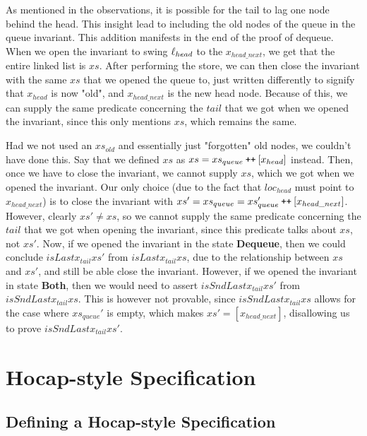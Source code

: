 \documentclass[a4paper, 11pt]{report}
\newcommand{\DequeueState}{\textbf{Dequeue}}
\newcommand{\BothState}{\textbf{Both}}
\newcommand\catenate{\mathbin{\text{\ttfamily\upshape ++}}}
\begin{document}
As mentioned in the observations, it is possible for the tail to lag one node behind the head. This insight lead to including the old nodes of the queue in the queue invariant. This addition manifests in the end of the proof of dequeue. When we open the invariant to swing $\ell_{head}$ to the $x_{head\_next}$, we get that the entire linked list is $xs$. After performing the store, we can then close the invariant with the same $xs$ that we opened the queue to, just written differently to signify that $x_{head}$ is now "old", and $x_{head\_next}$ is the new head node. Because of this, we can supply the same predicate concerning the $tail$ that we got when we opened the invariant, since this only mentions $xs$, which remains the same.

Had we not used an $xs_{old}$ and essentially just "forgotten" old nodes, we couldn't have done this. Say that we defined $xs$ as $xs = xs_{queue} \catenate [x_{head}]$ instead. Then, once we have to close the invariant, we cannot supply $xs$, which we got when we opened the invariant. Our only choice (due to the fact that $loc_{head}$ must point to $x_{head\_next}$) is to close the invariant with $xs' = xs_{queue} = xs_{queue}' \catenate [x_{head\_next}]$. However, clearly $xs' \neq xs$, so we cannot supply the same predicate concerning the $tail$ that we got when opening the invariant, since this predicate talks about $xs$, not $xs'$. Now, if we opened the invariant in the state \DequeueState{}, then we could conclude $isLast x_{tail} xs'$ from $isLast x_{tail} xs$, due to the relationship between $xs$ and $xs'$, and still be able close the invariant. However, if we opened the invariant in state \BothState{}, then we would need to assert $isSndLast x_{tail} xs'$ from $isSndLast x_{tail} xs$. This is however not provable, since $isSndLast x_{tail} xs$ allows for the case where $xs_{queue}'$ is empty, which makes $xs' = [x_{head\_next}]$, disallowing us to prove $isSndLast x_{tail} xs'$.


\chapter{Hocap-style Specification}
\label{ch:TLMSQHOCAP}

\section{Defining a Hocap-style Specification}
\label{TLMSQHOCAP:section:hocap-spec}
\end{document}
